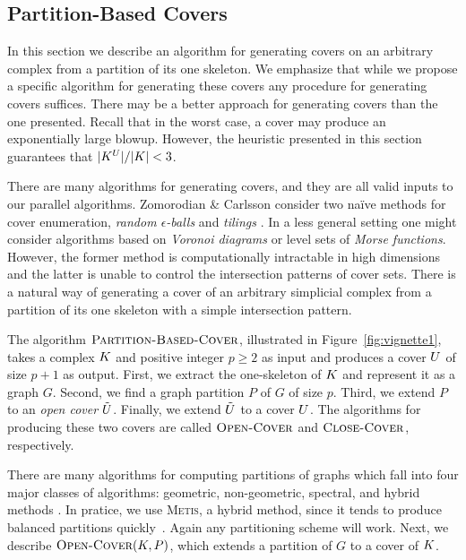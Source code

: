 \subsection{Partition-Based Covers}
\label{sec:partition-based-covers}
\label{sec:pcover}

In this section we describe an algorithm for generating covers on an 
arbitrary complex from a partition of its one skeleton. We emphasize that while we propose a specific
algorithm for generating these covers any procedure for generating covers suffices. 
There may be a better approach for generating covers than the one presented. Recall that in the worst case,
a cover may produce an exponentially large blowup. However, the heuristic presented in this section guarantees that $|K^{U}|/|K| < 3$. 

There are many algorithms for generating covers, and they are all valid inputs to our parallel algorithms. 
Zomorodian \& Carlsson consider two na\"ive methods for cover enumeration, \emph{random $\epsilon$-balls} 
and \emph{tilings} \cite{zc-lh-08}. In a less general setting one might consider
algorithms based on \emph{Voronoi diagrams} or level sets of 
\emph{Morse functions}. However, the former method is
computationally intractable in high dimensions and 
the latter is unable to control the intersection patterns of cover sets. 
There is a natural way of generating a cover of an arbitrary simplicial complex from a 
partition of its one skeleton with a simple intersection pattern. 

The algorithm $\textnormal{\scshape Partition-Based-Cover}$, illustrated in Figure~\ref{fig:vignette1}, takes a complex $K$ and positive 
integer $p \geq 2$ as input and produces a cover $U$ of size $p+1$ as output. 
First, we extract the one-skeleton of $K$ and represent it as a graph $G$. 
Second, we find a graph partition $P$ of $G$ of size $p$.  
Third, we extend $P$ to an \emph{open cover} $\tilde{U}$. Finally, we extend $\tilde{U}$ to a cover $U$. The algorithms
for producing these two covers are called $\textnormal{\scshape Open-Cover}$ and
$\textnormal{\scshape Close-Cover}$, respectively. 

There are many algorithms for computing partitions of graphs which
fall into four major classes of algorithms: geometric, non-geometric, 
spectral, and hybrid methods \cite{fj-gp-98}. In pratice, we use \textsc{Metis}, 
a hybrid method, since it tends to produce balanced partitions quickly~\cite{KaKu95}. Again
any partitioning scheme will work. 
Next, we describe $\textnormal{\scshape Open-Cover}(K,P)$, which extends a partition of $G$ to a cover of $K$. 

